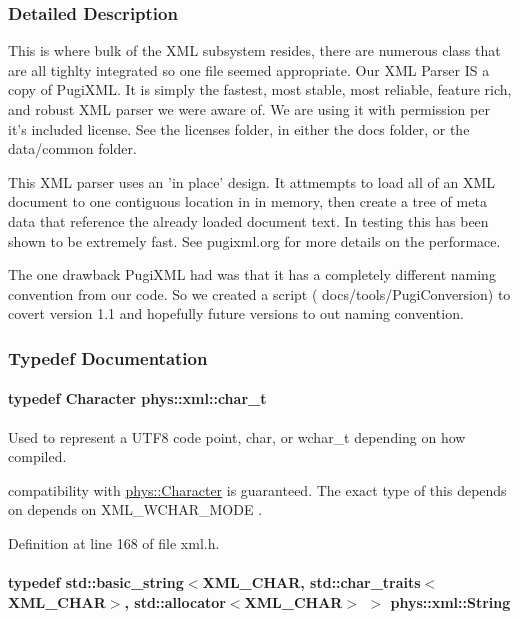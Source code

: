 \subsubsection{Detailed Description}
This is where bulk of the XML subsystem resides, there are numerous class that are all tighlty integrated so one file seemed appropriate. Our XML Parser IS a copy of PugiXML. It is simply the fastest, most stable, most reliable, feature rich, and robust XML parser we were aware of. We are using it with permission per it's included license. See the licenses folder, in either the docs folder, or the data/common folder. \par
 \par
 This XML parser uses an 'in place' design. It attmempts to load all of an XML document to one contiguous location in in memory, then create a tree of meta data that reference the already loaded document text. In testing this has been shown to be extremely fast. See pugixml.org for more details on the performace. \par
 \par
 The one drawback PugiXML had was that it has a completely different naming convention from our code. So we created a script ( docs/tools/PugiConversion) to covert version 1.1 and hopefully future versions to out naming convention. 

\subsubsection{Typedef Documentation}
\hypertarget{namespacephys_1_1xml_afc87705cd1c2917d87b879715a2d8f6e}{
\paragraph[{char\_\-t}]{\setlength{\rightskip}{0pt plus 5cm}typedef {\bf Character} {\bf phys::xml::char\_\-t}}\hfill}
\label{d9/d27/namespacephys_1_1xml_afc87705cd1c2917d87b879715a2d8f6e}


Used to represent a UTF8 code point, char, or wchar\_\-t depending on how compiled. 

compatibility with \hyperlink{namespacephys_a3098bae5b0a3cd16eec331f766cc562b}{phys::Character} is guaranteed. The exact type of this depends on depends on XML\_\-WCHAR\_\-MODE . 

Definition at line 168 of file xml.h.

\hypertarget{namespacephys_1_1xml_a4d8ca7638328d16d303e5a4c849f4704}{
\paragraph[{String}]{\setlength{\rightskip}{0pt plus 5cm}typedef std::basic\_\-string$<$XML\_\-CHAR, std::char\_\-traits$<$XML\_\-CHAR$>$, std::allocator$<$XML\_\-CHAR$>$ $>$ {\bf phys::xml::String}}\hfill}
\label{d9/d27/namespacephys_1_1xml_a4d8ca7638328d16d303e5a4c849f4704}


